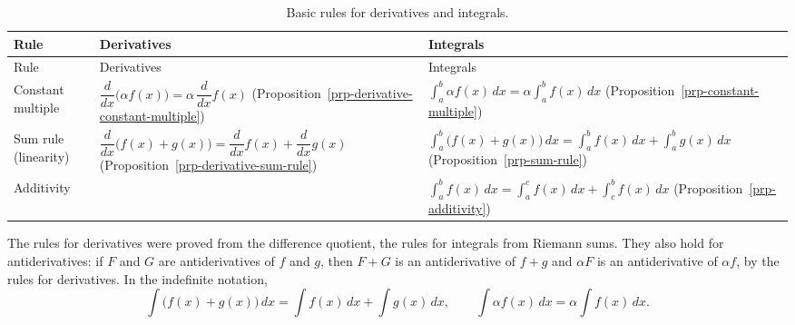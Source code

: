 \documentclass[
  letterpaper,
  DIV=11,
  numbers=noendperiod]{scrreprt}
\theoremstyle{plain}
\theoremstyle{plain}
\theoremstyle{definition}
\theoremstyle{definition}
\theoremstyle{definition}
\theoremstyle{plain}
\theoremstyle{plain}
\theoremstyle{remark}
\begin{document}
\begin{longtable}[]{@{}
  >{\raggedright\arraybackslash}p{}
  >{\raggedright\arraybackslash}p{}
  >{\raggedright\arraybackslash}p{}@{}}
\caption{Basic rules for derivatives and
integrals.}\label{tbl-basic-rules}\tabularnewline
\toprule\noalign{}
\begin{minipage}[b]{\linewidth}\raggedright
Rule
\end{minipage} & \begin{minipage}[b]{\linewidth}\raggedright
Derivatives
\end{minipage} & \begin{minipage}[b]{\linewidth}\raggedright
Integrals
\end{minipage} \\
\midrule\noalign{}
\endfirsthead
\toprule\noalign{}
\begin{minipage}[b]{\linewidth}\raggedright
Rule
\end{minipage} & \begin{minipage}[b]{\linewidth}\raggedright
Derivatives
\end{minipage} & \begin{minipage}[b]{\linewidth}\raggedright
Integrals
\end{minipage} \\
\midrule\noalign{}
\endhead
\bottomrule\noalign{}
\endlastfoot
Constant multiple &
\(\dfrac{d}{dx}\big(\alpha f(x)\big) = \alpha\,\dfrac{d}{dx}f(x)\)
(Proposition~\ref{prp-derivative-constant-multiple}) &
\(\displaystyle\int_a^b \alpha f(x)\,dx = \alpha\int_a^b f(x)\,dx\)
(Proposition~\ref{prp-constant-multiple}) \\
Sum rule (linearity) &
\(\dfrac{d}{dx}\big(f(x)+g(x)\big) = \dfrac{d}{dx}f(x) + \dfrac{d}{dx}g(x)\)
(Proposition~\ref{prp-derivative-sum-rule}) &
\(\displaystyle\int_a^b \big(f(x)+g(x)\big)\,dx = \int_a^b f(x)\,dx + \int_a^b g(x)\,dx\)
(Proposition~\ref{prp-sum-rule}) \\
Additivity & &
\(\displaystyle\int_a^b f(x)\,dx = \int_a^c f(x)\,dx + \int_c^b f(x)\,dx\)
(Proposition~\ref{prp-additivity}) \\
\end{longtable}

The rules for derivatives were proved from the difference quotient, the
rules for integrals from Riemann sums. They also hold for
antiderivatives: if \(F\) and \(G\) are antiderivatives of \(f\) and
\(g\), then \(F+G\) is an antiderivative of \(f+g\) and \(\alpha F\) is
an antiderivative of \(\alpha f\), by the rules for derivatives. In the
indefinite notation, \[
\int \big(f(x)+g(x)\big)\,dx = \int f(x)\,dx + \int g(x)\,dx, \qquad
\int \alpha f(x)\,dx = \alpha\int f(x)\,dx .
\]
\end{document}
